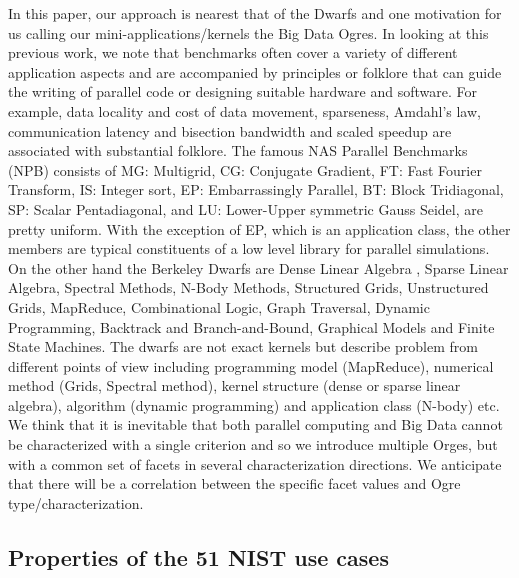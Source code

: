 \documentclass{acm_proc_article-sp}
\begin{document}
In this paper, our approach is nearest that of the Dwarfs and one motivation
for us calling our mini-applications/kernels the Big Data Ogres. In looking at
this previous work, we note that benchmarks often cover a variety of different
application aspects and are accompanied by principles or folklore that can
guide the writing of parallel code or designing suitable hardware and software.
For example, data locality and cost of data movement, sparseness, Amdahl's law,
communication latency and bisection bandwidth and scaled speedup are associated
with substantial folklore. The famous NAS Parallel Benchmarks (NPB) consists of
MG: Multigrid, CG: Conjugate Gradient, FT: Fast Fourier Transform, IS: Integer
sort, EP: Embarrassingly Parallel, BT: Block Tridiagonal, SP: Scalar
Pentadiagonal, and LU: Lower-Upper symmetric Gauss Seidel, are pretty uniform.
With the exception of EP, which is an application class, the other members are
typical constituents of a low level library for parallel simulations. On the
other hand the Berkeley Dwarfs are Dense Linear Algebra , Sparse Linear
Algebra, Spectral Methods, N-Body Methods, Structured Grids, Unstructured
Grids, MapReduce, Combinational Logic, Graph Traversal, Dynamic Programming,
Backtrack and Branch-and-Bound, Graphical Models and Finite State Machines. The
dwarfs are not exact kernels but describe problem from different points of view
including programming model (MapReduce), numerical method (Grids, Spectral
method), kernel structure (dense or sparse linear algebra), algorithm (dynamic
programming) and application class (N-body) etc. We think that it is inevitable
that both parallel computing and Big Data cannot be characterized with a single
criterion and so we introduce multiple Orges, but with a common set of facets
in several characterization directions. We anticipate that there will be a
correlation between the specific facet values and Ogre type/characterization.


\subsection{Properties of the 51 NIST use cases}
\end{document}

